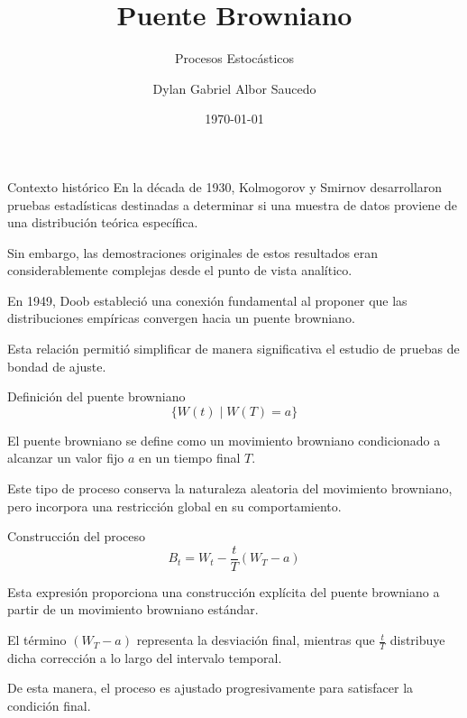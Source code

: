 \documentclass{beamer}
\title[Puente Browniano]{\textbf{Puente Browniano}}
\subtitle{Procesos Estocásticos}
\author{Dylan Gabriel Albor Saucedo}
\date{\today}
\begin{document}
\begin{frame}
    \titlepage
\end{frame}

\begin{frame}{Contexto histórico}
En la década de 1930, Kolmogorov y Smirnov desarrollaron pruebas estadísticas destinadas a determinar si una muestra de datos proviene de una distribución teórica específica.

\vspace{0.3cm}
Sin embargo, las demostraciones originales de estos resultados eran considerablemente complejas desde el punto de vista analítico.

\vspace{0.3cm}
En 1949, Doob estableció una conexión fundamental al proponer que las distribuciones empíricas convergen hacia un puente browniano.

\vspace{0.3cm}
Esta relación permitió simplificar de manera significativa el estudio de pruebas de bondad de ajuste.
\end{frame}

\begin{frame}{Definición del puente browniano}
\[
\{W(t) \mid W(T)=a\}
\]

El puente browniano se define como un movimiento browniano condicionado a alcanzar un valor fijo $a$ en un tiempo final $T$.

\vspace{0.3cm}
Este tipo de proceso conserva la naturaleza aleatoria del movimiento browniano, pero incorpora una restricción global en su comportamiento.
\end{frame}

\begin{frame}{Construcción del proceso}
\[
B_t = W_t - \frac{t}{T}(W_T - a)
\]

Esta expresión proporciona una construcción explícita del puente browniano a partir de un movimiento browniano estándar.

\vspace{0.3cm}
El término $(W_T - a)$ representa la desviación final, mientras que $\frac{t}{T}$ distribuye dicha corrección a lo largo del intervalo temporal.

\vspace{0.3cm}
De esta manera, el proceso es ajustado progresivamente para satisfacer la condición final.
\end{frame}
\end{document}
